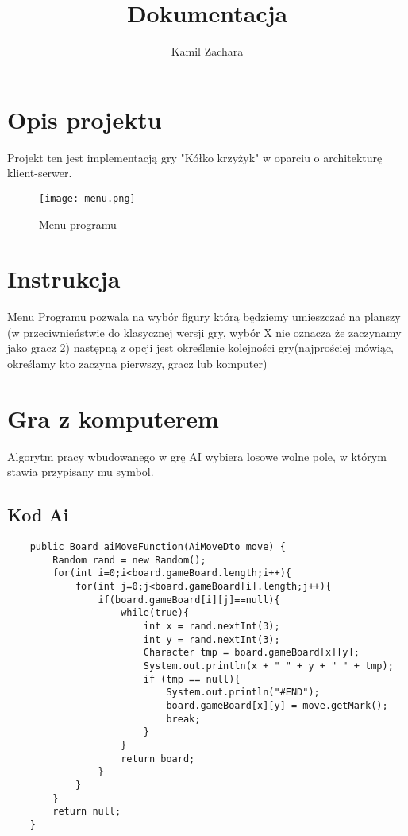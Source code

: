 \documentclass{article}
\title{Dokumentacja}
\author{Kamil Zachara}
\begin{document}
\maketitle

\section{Opis projektu}
Projekt ten jest implementacją gry "Kółko krzyżyk" w oparciu o architekturę klient-serwer.

\begin{figure}[h!]
\centering
\texttt{[image: menu.png]}
\caption{Menu programu}
\end{figure}

\section{Instrukcja}
Menu Programu pozwala na wybór figury którą będziemy umieszczać na planszy (w przeciwnieństwie do klasycznej wersji gry, wybór X nie oznacza że zaczynamy jako gracz 2)
następną z opcji jest określenie kolejności gry(najprościej mówiąc, określamy kto zaczyna pierwszy, gracz lub komputer)
\newpage
\section{Gra z komputerem}
Algorytm pracy wbudowanego w grę AI wybiera losowe wolne pole, w którym stawia przypisany mu symbol.

\subsection{Kod Ai}
\begin{lstlisting}
    public Board aiMoveFunction(AiMoveDto move) {
        Random rand = new Random();
        for(int i=0;i<board.gameBoard.length;i++){
            for(int j=0;j<board.gameBoard[i].length;j++){
                if(board.gameBoard[i][j]==null){
                    while(true){
                        int x = rand.nextInt(3);
                        int y = rand.nextInt(3);
                        Character tmp = board.gameBoard[x][y];
                        System.out.println(x + " " + y + " " + tmp);
                        if (tmp == null){
                            System.out.println("#END");
                            board.gameBoard[x][y] = move.getMark();
                            break;
                        }
                    }
                    return board;
                }
            }
        }
        return null;
    }
\end{lstlisting}
\end{document}
